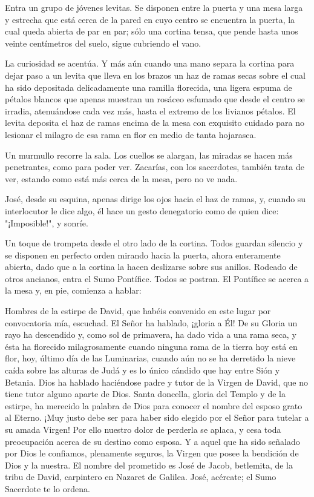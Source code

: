 \documentclass[12pt, twoside, openright]{book} %
\begin{document}
Entra un grupo de jóvenes levitas. Se disponen entre la puerta y una mesa larga y estrecha que está cerca de la pared en cuyo centro se encuentra la puerta, la cual queda abierta de par en par; sólo una cortina tensa, que pende hasta unos veinte centímetros del suelo, sigue cubriendo el vano. 

La curiosidad se acentúa. Y más aún cuando una mano separa la cortina para dejar paso a un levita que lleva en los brazos un haz de ramas secas sobre el cual ha sido depositada delicadamente una ramilla florecida, una ligera espuma de pétalos blancos que apenas muestran un rosáceo esfumado que desde el centro se irradia, atenuándose cada vez más, hasta el extremo de los livianos pétalos. El levita deposita el haz de ramas encima de la mesa con exquisito cuidado para no lesionar el milagro de esa rama en flor en medio de tanta hojarasca. 

Un murmullo recorre la sala. Los cuellos se alargan, las miradas se hacen más penetrantes, como para poder ver. Zacarías, con los sacerdotes, también trata de ver, estando como está más cerca de la mesa, pero no ve nada. 

José, desde su esquina, apenas dirige los ojos hacia el haz de ramas, y, cuando su interlocutor le dice algo, él hace un gesto denegatorio como de quien dice: "¡Imposible!", y sonríe. 

Un toque de trompeta desde el otro lado de la cortina. Todos guardan silencio y se disponen en perfecto orden mirando hacia la puerta, ahora enteramente abierta, dado que a la cortina la hacen deslizarse sobre sus anillos. Rodeado de otros ancianos, entra el Sumo Pontífice. Todos se postran. El Pontífice se acerca a la mesa y, en pie, comienza a hablar: 

Hombres de la estirpe de David, que habéis convenido en este lugar por convocatoria mía, escuchad. El Señor ha hablado, ¡gloria a Él! De su Gloria un rayo ha descendido y, como sol de primavera, ha dado vida a una rama seca, y ésta ha florecido milagrosamente cuando ninguna rama de la tierra hoy está en flor, hoy, último día de las Luminarias, cuando aún no se ha derretido la nieve caída sobre las alturas de Judá y es lo único cándido que hay entre Sión y Betania. Dios ha hablado haciéndose padre y tutor de la Virgen de David, que no tiene tutor alguno aparte de Dios. Santa doncella, gloria del Templo y de la estirpe, ha merecido la palabra de Dios para conocer el nombre del esposo grato al Eterno. ¡Muy justo debe ser para haber sido elegido por el Señor para tutelar a su amada Virgen! Por ello nuestro dolor de perderla se aplaca, y cesa toda preocupación acerca de su destino como esposa. Y a aquel que ha sido señalado por Dios le confiamos, plenamente seguros, la Virgen que posee la bendición de Dios y la nuestra. El nombre del prometido es José de Jacob, betlemita, de la tribu de David, carpintero en Nazaret de Galilea. José, acércate; el Sumo Sacerdote te lo ordena. 
\end{document}
